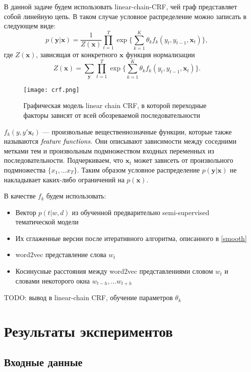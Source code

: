 \documentclass[pdftex,ptm,12pt,a4paper]{report}
\theoremstyle{definition}
\begin{document}
В данной задаче будем использовать linear-chain-CRF, чей граф представляет собой линейную цепь. В таком случае условное распределение можно записать в следующем виде:
\[
p(\boldsymbol{y}|\boldsymbol{x}) = \frac{1}{Z(\boldsymbol{x})} \prod_{t=1}^{T} \exp{\{
	\sum_{k=1}^{K}\theta_{k}f_k(y_t, y_{t-1}, \boldsymbol{x}_t)
	\}},
\]
где $Z(\boldsymbol{x})$, зависящая от конкретного $\boldsymbol{x}$ функция нормализации
\[
Z(\boldsymbol{x}) = \sum_{\boldsymbol{y}}\prod_{t=1}^{T}\exp{ \{
	\sum_{k=1}^{K}\theta_{k}f_k(y_t, y_{t-1}, \boldsymbol{x}_t) \}
}.
\]
\begin{figure}[t]
	\begin{center}
		\texttt{[image: crf.png]}
		\caption{Графическая модель linear chain CRF, в которой переходные факторы зависят от всей обозреваемой последовательности}
		\label{fig:crf_image}
	\end{center}
\end{figure}

$f_k(y, y'\boldsymbol{x}_t)$ --- произвольные вещественнозначные функции, которые также называются $\emph{feature functions}.$ Они описывают зависимости между соседними метками тем и произвольным подмножеством входных переменных из последовательности. Подчеркиваем, что $\boldsymbol{x}_t$ может зависеть от произвольного подмножества $\{x_1, \dots x_T\}$. Таким образом условное распределение $p(\boldsymbol{y}|\boldsymbol{x})$ не накладывает каких-либо ограничений на $p(\boldsymbol{x})$.

В качестве $f_k$ будем использовать:
\begin{itemize} 
	\item Вектор $p(t|w,d)$ из обученной предварительно semi-supervised тематической модели
	\item Их сглаженные версии после итеративного алгоритма, описанного в \ref{smooth}
	\item word2vec представление слова $w_t$
	\item Косинусные расстояния между word2vec представлениями словом $w_t$ и словами некоторого окна $w_{t-h}, \dots w_{t+h}$
\end{itemize}

TODO: вывод в linear-chain CRF, обучение параметров $\theta_k$ 


\chapter{Результаты экспериментов}

\section{Входные данные}
\end{document}
